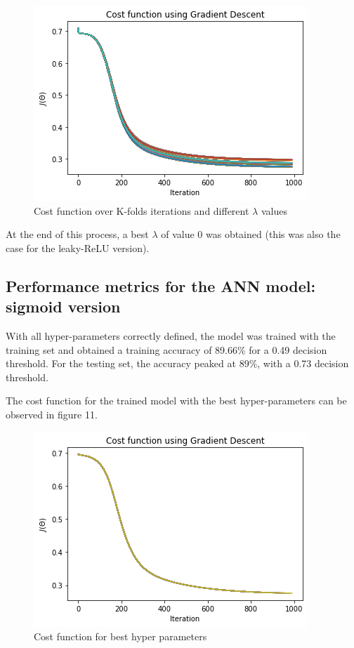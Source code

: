 \documentclass[conference]{IEEEtran}
\begin{document}
\begin{figure}[H]
\centering
\includegraphics[scale=0.6]{CostFuncEvo.png}
\caption{Cost function over K-folds iterations and different $\lambda$ values}
\label{fig:kfoldsiter}
\end{figure}

\par
At the end of this process, a best $\lambda$ of value 0 was obtained (this was also the case for the leaky-ReLU version). 

\subsection{Performance metrics for the ANN model: sigmoid version}
With all hyper-parameters correctly defined, the model was trained with the training set and obtained a training accuracy of 89.66\% for a 0.49 decision threshold. For the testing set, the accuracy peaked at 89\%, with a 0.73 decision threshold.
\par 
The cost function for the trained model with the best hyper-parameters can be observed in figure 11.
\begin{figure}[H]
\centering
\includegraphics[scale=0.6]{CostFuncTrainSigm.png}
\caption{Cost function for best hyper parameters}
\label{fig:kfoldsiter}
\end{figure}
\end{document}
